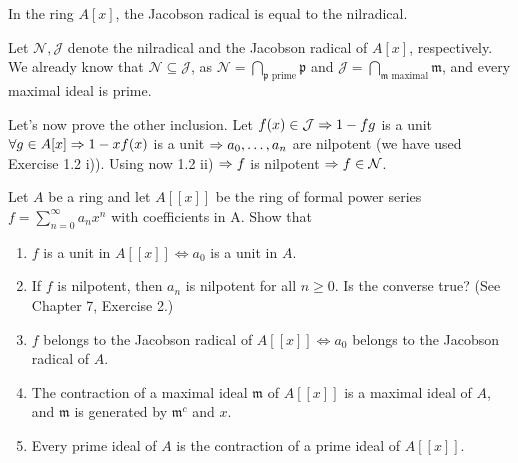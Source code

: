 \begin{ex}
	In the ring $A[x]$, the Jacobson radical is equal to the nilradical.
\end{ex}

\begin{sol}
	Let $\mathcal{N}, \mathcal{J}$ denote the nilradical and the Jacobson radical of $A[x]$, respectively. We already know that $ \mathcal{N} \subseteq \mathcal{J}$, as $\mathcal{N} = \bigcap\limits_{\mathfrak{p} \text{ prime}} \mathfrak{p}$ and $\mathcal{J} = \bigcap\limits_{\mathfrak{m} \text{ maximal}} \mathfrak{m}$, and every maximal ideal is prime.

	Let's now prove the other inclusion. Let $f(x) \in \mathcal{J} \Rightarrow 1-fg$ is a unit $\forall g \in A[x] \Rightarrow 1- xf(x)$ is a unit $\Rightarrow a_0, \dots, a_n$ are nilpotent (we have used Exercise 1.2 i)). Using now 1.2 ii) $\Rightarrow f$ is nilpotent $\Rightarrow f \in \mathcal{N}$.
\end{sol}

\begin{ex}
 Let $A$ be a ring and let $A[[x]]$ be the ring of formal power series $f = \sum\limits_{n = 0}^{\infty} a_nx^n$ with coefficients in A. Show that

 \begin{enumerate}[label=(\roman*)]
		\item $f$ is a unit in $A[[x]] \iff a_0$ is a unit in $A$.

		\item If $f$ is nilpotent, then $a_n$ is nilpotent for all $n \geq 0$. Is the converse true? (See Chapter 7, Exercise 2.)

		\item $f$ belongs to the Jacobson radical of $A[[x]] \iff a_0$ belongs to the Jacobson radical of $A$.

		\item The contraction of a maximal ideal $\mathfrak{m}$ of $A[[x]]$ is a maximal ideal of $A$, and $\mathfrak{m}$ is generated by $\mathfrak{m}^c$ and $x$.

		\item Every prime ideal of $A$ is the contraction of a prime ideal of $A[[x]]$.
\end{enumerate}
\end{ex}

